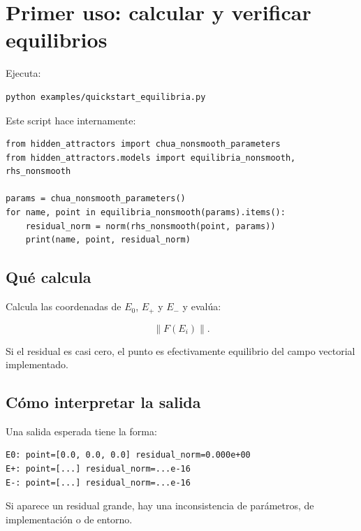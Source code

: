 \documentclass[11pt,letterpaper]{article}
\begin{document}
\section{Primer uso: calcular y verificar equilibrios}

Ejecuta:

\begin{lstlisting}[style=terminal]
python examples/quickstart_equilibria.py
\end{lstlisting}

Este script hace internamente:

\begin{lstlisting}[style=python]
from hidden_attractors import chua_nonsmooth_parameters
from hidden_attractors.models import equilibria_nonsmooth, rhs_nonsmooth

params = chua_nonsmooth_parameters()
for name, point in equilibria_nonsmooth(params).items():
    residual_norm = norm(rhs_nonsmooth(point, params))
    print(name, point, residual_norm)
\end{lstlisting}

\subsection{Qué calcula}

Calcula las coordenadas de $E_0$, $E_+$ y $E_-$ y evalúa:

\begin{equation}
\|F(E_i)\|.
\end{equation}

Si el residual es casi cero, el punto es efectivamente equilibrio del campo vectorial implementado.

\subsection{Cómo interpretar la salida}

Una salida esperada tiene la forma:

\begin{lstlisting}[style=terminal]
E0: point=[0.0, 0.0, 0.0] residual_norm=0.000e+00
E+: point=[...] residual_norm=...e-16
E-: point=[...] residual_norm=...e-16
\end{lstlisting}

Si aparece un residual grande, hay una inconsistencia de parámetros, de implementación o de entorno.

\end{document}
